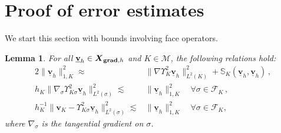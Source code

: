 \documentclass[a4paper,11pt]{article}
\newtheorem{lemma}[theorem]{Lemma}
\theoremstyle{definition}
\theoremstyle{remark}
\newcommand{\uvec}[1]{\underline{\mathbf{#1}}}
\newcommand{\bo}[1]{\mathbf{#1}}
\newcommand{\up}[1]{\Upsilon^2_{#1}}
\def\cF{\mathcal{F}}
\def\cM{\mathcal{M}}
\def\dgs{\boldsymbol{X}_{{\bf grad},h}}
\def\Ksig{{K\!\sigma}}
\begin{document}
\section{Proof of error estimates}\label{sec_proofs}
We start this section with bounds involving face operators.

\begin{lemma}
For all $\uvec{v}_h\in\dgs$ and $K\in\cM$, the following relations hold:
\begin{alignat}{2}
\lVert \uvec{v}_h\rVert^2_{1,K}\approx{}&\lVert \nabla\up{K}\uvec{v}_h\rVert^2_{L^2(K)}+\mathbb S_K(\uvec{v}_h,\uvec{v}_h)\,,\label{eq:norm_equiv}\\
h_K\lVert \nabla_\sigma \up{\Ksig}\uvec{v}_h\rVert^2_{L^2(\sigma)}\lesssim{}&\lVert \uvec{v}_h\rVert^2_{1,K}\quad\forall \sigma\in\cF_K\,,\label{eq:gradPot.bound}\\
h^{-{1}}_K\lVert \bo{v}_K-\up{\Ksig}\uvec{v}_h\rVert^2_{L^2(\sigma)}\lesssim{}&\lVert\uvec{v}_h\rVert_{1,K}^2\quad\forall \sigma\in\cF_K,\label{eq:vk.bound}
\end{alignat}
where $\nabla_\sigma$ is the tangential gradient on $\sigma$.
\end{lemma}
\end{document}
